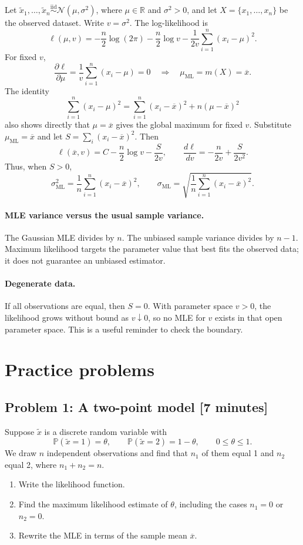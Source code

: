 \documentclass[11pt]{article}
\newcommand{\Pbb}{\mathbb{P}}
\newcommand{\iid}{\mathrel{\overset{\mathrm{iid}}{\sim}}}
\newcommand{\MLE}{\mathrm{ML}}
\newcommand{\R}{\mathbb{R}}
\newcommand{\rv}[1]{\widetilde{#1}}
\newcommand{\workingspace}[1]{}
\newcommand{\workingspace}[1]{\vspace{#1}}
\begin{document}
Let $\rv{x}_1,\ldots,\rv{x}_n\iid\mathcal N(\mu,\sigma^2)$, where
$\mu\in\R$ and $\sigma^2>0$, and let $X=\{x_1,\ldots,x_n\}$ be the observed
dataset. Write $v=\sigma^2$. The log-likelihood is
\[
  \ell(\mu,v)
  =-\frac n2\log(2\pi)-\frac n2\log v
    -\frac{1}{2v}\sum_{i=1}^n(x_i-\mu)^2.
\]
For fixed $v$,
\[
  \frac{\partial\ell}{\partial\mu}
  =\frac{1}{v}\sum_{i=1}^n(x_i-\mu)=0
  \quad\Longrightarrow\quad
  \boxed{\mu_{\MLE}=m(X)=\overline x.}
\]
The identity
\[
  \sum_{i=1}^n(x_i-\mu)^2
  =\sum_{i=1}^n(x_i-\overline x)^2+n(\mu-\overline x)^2
\]
also shows directly that $\mu=\overline x$ gives the global maximum for fixed
$v$. Substitute $\mu_{\MLE}=\overline x$ and let
$S=\sum_i(x_i-\overline x)^2$. Then
\[
  \ell(\overline x,v)=C-\frac n2\log v-\frac{S}{2v},
  \qquad
  \frac{d\ell}{dv}=-\frac{n}{2v}+\frac{S}{2v^2}.
\]
Thus, when $S>0$,
\[
  \boxed{\sigma_{\MLE}^2
  =\frac{1}{n}\sum_{i=1}^n(x_i-\overline x)^2,}
  \qquad
  \boxed{\sigma_{\MLE}
  =\sqrt{\frac{1}{n}\sum_{i=1}^n(x_i-\overline x)^2}.}
\]

\paragraph{MLE variance versus the usual sample variance.}
The Gaussian MLE divides by $n$. The unbiased sample variance divides by
$n-1$. Maximum likelihood targets the parameter value that best fits the
observed data; it does not guarantee an unbiased estimator.

\paragraph{Degenerate data.}
If all observations are equal, then $S=0$. With parameter space $v>0$, the
likelihood grows without bound as $v\downarrow0$, so no MLE for $v$ exists in
that open parameter space. This is a useful reminder to check the boundary.

\newpage
\section*{Practice problems}

\subsection*{Problem 1: A two-point model \hfill [7 minutes]}
Suppose $\rv{x}$ is a discrete random variable with
\[
  \Pbb(\rv{x}=1)=\theta,
  \qquad
  \Pbb(\rv{x}=2)=1-\theta,
  \qquad 0\leq\theta\leq1.
\]
We draw $n$ independent observations and find that $n_1$ of them equal 1 and
$n_2$ equal 2, where $n_1+n_2=n$.
\begin{enumerate}[label=(\alph*),itemsep=0.35em]
  \item Write the likelihood function.
  \item Find the maximum likelihood estimate of $\theta$, including the
        cases $n_1=0$ or $n_2=0$.
  \item Rewrite the MLE in terms of the sample mean $\overline x$.
\end{enumerate}
\workingspace{4.5cm}
\end{document}
